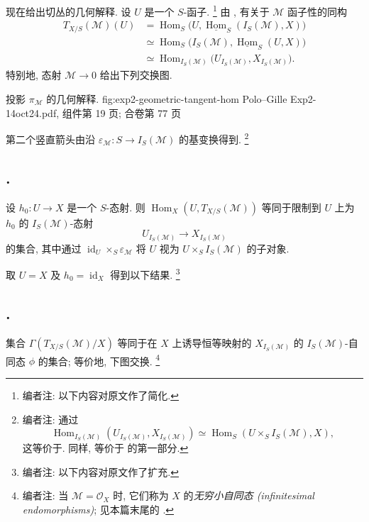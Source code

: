 现在给出切丛的几何解释. 设 \(U\) 是一个 \(S\)-函子.
\footnote{编者注: 以下内容对原文作了简化.}
由 ,
有关于 \(\mathcal M\) 函子性的同构
\begin{align*}
  T_{X/S}(\mathcal M)(U)
  &=\operatorname{Hom}_S
    \bigl(U,\underline{\operatorname{Hom}}_S(I_S(\mathcal M),X)\bigr)\\
  &\simeq\operatorname{Hom}_S
    \bigl(I_S(\mathcal M),\underline{\operatorname{Hom}}_S(U,X)\bigr)\\
  &\simeq\operatorname{Hom}_{I_S(\mathcal M)}
    \bigl(U_{I_S(\mathcal M)},X_{I_S(\mathcal M)}\bigr).
\end{align*}
特别地, 态射 \(\mathcal M\to0\) 给出下列交换图.

  {投影 \(\pi_{\mathcal M}\) 的几何解释.}
  {fig:exp2-geometric-tangent-hom}
  {Polo--Gille Exp2-14oct24.pdf, 组件第 19 页; 合卷第 77 页}

第二个竖直箭头由沿
\(\varepsilon_{\mathcal M}:S\to I_S(\mathcal M)\) 的基变换得到.
\footnote{编者注: 通过
\[
  \operatorname{Hom}_{I_S(\mathcal M)}
    (U_{I_S(\mathcal M)},X_{I_S(\mathcal M)})
  \simeq\operatorname{Hom}_S(U\times_SI_S(\mathcal M),X),
\]
这等价于.
同样, 
等价于 的第一部分.}

\subsection*{.}
设 \(h_0:U\to X\) 是一个 \(S\)-态射.
则 \(\operatorname{Hom}_X(U,T_{X/S}(\mathcal M))\)
等同于限制到 \(U\) 上为 \(h_0\) 的 \(I_S(\mathcal M)\)-态射
\[
  U_{I_S(\mathcal M)}\longrightarrow X_{I_S(\mathcal M)}
\]
的集合, 其中通过 \(\operatorname{id}_U\times_S\varepsilon_{\mathcal M}\)
将 \(U\) 视为 \(U\times_SI_S(\mathcal M)\) 的子对象.

取 \(U=X\) 及 \(h_0=\operatorname{id}_X\) 得到以下结果.
\footnote{编者注: 以下内容对原文作了扩充.}

\subsection*{.}
集合 \(\Gamma(T_{X/S}(\mathcal M)/X)\)
等同于在 \(X\) 上诱导恒等映射的
\(X_{I_S(\mathcal M)}\) 的 \(I_S(\mathcal M)\)-自同态 \(\phi\)
的集合; 等价地, 下图交换.
\footnote{编者注: 当 \(\mathcal M=\mathcal O_X\) 时,
它们称为 \(X\) 的\emph{无穷小自同态 (infinitesimal endomorphisms)};
见本篇末尾的 .}

